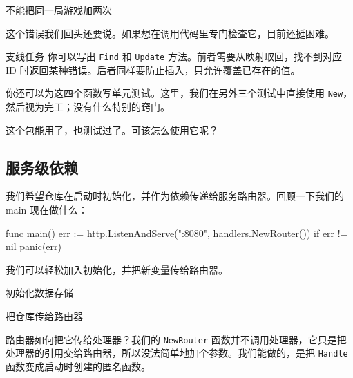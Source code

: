 \begin{codeannotations}
\item 不能把同一局游戏加两次
\end{codeannotations}

这个错误我们回头还要说。如果想在调用代码里专门检查它，目前还挺困难。

\begin{infobox}{支线任务}
你可以写出 \texttt{Find} 和 \texttt{Update} 方法。前者需要从映射取回，找不到对应 ID 时返回某种错误。后者同样要防止插入，只允许覆盖已存在的值。

你还可以为这四个函数写单元测试。这里，我们在另外三个测试中直接使用 \texttt{New}，然后视为完工；没有什么特别的窍门。

这个包能用了，也测试过了。可该怎么使用它呢？
\end{infobox}

\subsection{服务级依赖}

我们希望仓库在启动时初始化，并作为依赖传递给服务路由器。回顾一下我们的 main 现在做什么：

\begin{gocode}[]
func main() {
    err := http.ListenAndServe(":8080", handlers.NewRouter())
    if err != nil {
        panic(err)
    }
}
\end{gocode}

我们可以轻松加入初始化，并把新变量传给路由器。


\begin{codeannotations}
\item 初始化数据存储
\item 把仓库传给路由器
\end{codeannotations}

路由器如何把它传给处理器？我们的 \texttt{NewRouter} 函数并不调用处理器，它只是把处理器的引用交给路由器，所以没法简单地加个参数。我们能做的，是把 \texttt{Handle} 函数变成启动时创建的匿名函数。

